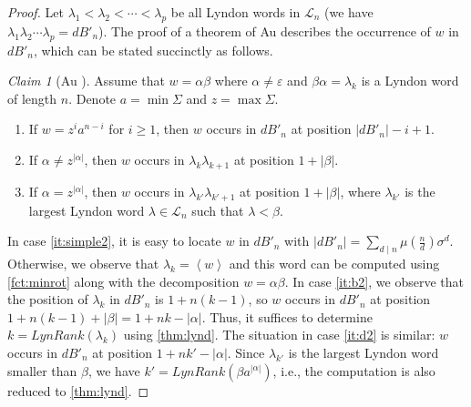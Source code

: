 \documentclass{article}
\newcommand{\dB}{dB}
\renewcommand{\L}{{\mathcal{L}}}
\newcommand{\Lynd}{\mathit{LynRank}}
\newcommand{\minrot}[1]{\left\langle #1 \right\rangle}
\theoremstyle{definition}
\theoremstyle{remark}
\newtheorem*{claim}{Claim}
\begin{document}
\begin{proof}
  Let $\lambda_1 < \lambda_2 < \cdots < \lambda_p$ be all Lyndon words in $\L_n$
  (we have $\lambda_1 \lambda_2 \cdots \lambda_p = \dB'_n$).
  The proof of a theorem of Au \cite[Theorem 9]{DBLP:journals/dm/Au15}
  describes the occurrence of $w$ in $\dB'_n$, which can be stated succinctly as follows.
  \begin{claim}[Au \cite{DBLP:journals/dm/Au15}]
       Assume that $w=\alpha\beta$ where $\alpha\ne \varepsilon$ and $\beta\alpha=\lambda_k$ is a Lyndon word of length $n$.
     Denote $a = \min\Sigma$ and $z = \max\Sigma$.
  \begin{enumerate}[label={(\alph*)}]
    \item\label{it:simple2} If $w=z^ia^{n-i}$ for $i\ge 1$, then $w$ occurs in $\dB'_n$ at position $|\dB'_n|-i+1$.
    \item\label{it:b2} If $\alpha \ne z^{|\alpha|}$, then $w$ occurs in $\lambda_k\lambda_{k+1}$ at position $1+|\beta|$.
    \item\label{it:d2} If $\alpha = z^{|\alpha|}$, then $w$ occurs in $\lambda_{k'}\lambda_{k'+1}$ at position $1+|\beta|$,
    where $\lambda_{k'}$ is the largest Lyndon word $\lambda\in \L_n$ such that $\lambda < \beta$.
  \end{enumerate}
  \end{claim}

  In case \ref{it:simple2}, it is easy to locate $w$ in $\dB'_n$ with $|\dB'_n| = \sum_{d \mid n} \mu(\tfrac{n}{d})\sigma^d$.
  Otherwise, we observe that $\lambda_k = \minrot{w}$ and this word can be computed using \cref{fct:minrot} along with the decomposition
  $w=\alpha\beta$.
  In case \ref{it:b2}, we observe that the position of $\lambda_k$ in $\dB'_n$
  is $1+n(k-1)$, so $w$ occurs in $\dB'_n$ at position $1+n(k-1)+|\beta|=1+nk-|\alpha|$.
  Thus, it suffices to determine $k=\Lynd(\lambda_k)$ using \cref{thm:lynd}.
  The situation in case \ref{it:d2} is similar: $w$ occurs in $\dB'_n$ at position $1+nk'-|\alpha|$.
  Since $\lambda_{k'}$ is the largest Lyndon word smaller than $\beta$, we have $k'=\Lynd(\beta a^{|\alpha|})$,
  i.e., the computation is also reduced to \cref{thm:lynd}.
\end{proof}
\end{document}
